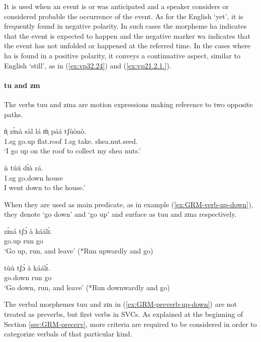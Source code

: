 \begin{exe}
\begin{exe}
\begin{exe}
{\begin{exe}
\begin{exe}
\begin{exe}
\begin{exe}
\begin{exe}
\begin{exe}
\begin{exe}
\begin{exe}
\begin{exe}
\begin{exe}
\begin{exe}
\begin{exe}
\begin{exe}
\begin{exe}
\begin{exe}
\begin{exe}
\begin{exe}
\begin{exe}
\begin{exe}
\begin{exe}
\begin{exe}
 It is used when an event is or was anticipated and a speaker considers or considered probable the 
occurrence of the event. As  for the English `yet', it is frequently found in negative polarity. In 
such cases the morpheme {\sls ha} indicates that the event is expected to happen and the negative 
marker {\sls wa} indicates that the event has not unfolded or happened at the referred time. In the 
cases where {\sls ha} is found in a positive polarity,  it  conveys a continuative aspect, similar 
to English `still',  as in (\ref{ex:vp32.24}) and (\ref{ex:vp21.2.1.}). 



\paragraph{tu and zɪn}
\label{sec:GRM-preverb-up-down} 

The verbs {\sls tuu} and {\sls zɪna} are motion
expressions making reference to two opposite paths. 


\ea\label{ex:GRM-verb-up-down}
\ea
\gll ǹ̩ zɪ́nà sàl lá ḿ̩ páá tʃùònò.\\
{\sc 1.sg} go.up flat.roof {\foc} {\sc 1.sg} take.{\pv} shea.nut.seed.{\pl}\\
\glt  `I go up on the roof to collect my shea nuts.'

\ex
\gll ǹ túú dɪ̀à rá.\\
{\sc 1.sg} go.down house {\foc}\\
\glt I went down to the house.'
\z 
 \z

When they are used as main
predicate, as in example (\ref{ex:GRM-verb-up-down}),  they denote `go down' and
`go up' and  surface as {\sls tuu} and {\sls zɪna} respectively. 




\ea\label{ex:GRM-preverb-up-down}
\ea\label{ex:GRM-preverb-up}
\gll zɪ́ná tʃɔ́  à káálɪ̀.\\
   {go.up} run {\conn} go\\
\glt  `Go up,  run, and leave'  (*Run upwardly and go)

\ex\label{ex:GRM-preverb-down}
\gll tùù tʃɔ́  à káálɪ̀.\\
   {go.down} run {\conn} go\\
\glt  `Go down, run, and leave'  (*Run downwardly and go)

\z 
 \z
 
The verbal morphemes {\sls tuu} and {\sls zɪn} in 
(\ref{ex:GRM-preverb-up-down}) 
are not treated as preverbs, but first verbs in SVCs.  As explained at the 
beginning of  Section \ref{sec:GRM-precerv}, more criteria are required to be 
considered in order to categorize verbals  of that particular kind.



\end{exe}
\end{exe}
\end{exe}
\end{exe}
\end{exe}
\end{exe}
\end{exe}
\end{exe}
\end{exe}
\end{exe}
\end{exe}
\end{exe}
\end{exe}
\end{exe}
\end{exe}
\end{exe}
\end{exe}
\end{exe}
\end{exe}
\end{exe}
\end{exe}}
\end{exe}
\end{exe}
\end{exe}
